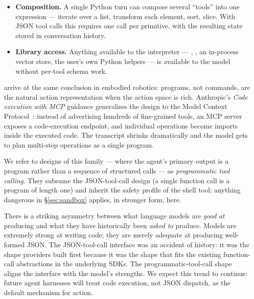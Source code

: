 \begin{itemize}[leftmargin=1.5em]
\item \textbf{Composition.} A single Python turn can compose several
  ``tools'' into one expression --- iterate over a list, transform
  each element, sort, slice. With JSON tool calls this requires one
  call per primitive, with the resulting state stored in conversation
  history.
\item \textbf{Library access.} Anything available to the
  interpreter --- , , an in-process
  vector store, the user's own Python helpers --- is available to
  the model without per-tool schema work.
\end{itemize}

\citet{liang2023codeaspolicies} arrive at the same conclusion in
embodied robotics: programs, not commands, are the natural action
representation when the action space is rich. Anthropic's
\emph{Code execution with MCP} guidance generalises the design to
the Model Context Protocol~\citep{mcp2024spec,anthropic2025mcpcode}:
instead of advertising hundreds of fine-grained tools, an MCP server
exposes a code-execution endpoint, and individual operations become
imports inside the executed code. The transcript shrinks
dramatically and the model gets to plan multi-step operations as a
single program.

We refer to designs of this family --- where the agent's primary
output is a program rather than a sequence of structured calls --- as
\emph{programmatic tool calling}. They subsume the JSON-tool-call
design (a single function call is a program of length one) and
inherit the safety profile of the shell tool: anything dangerous in
\S\ref{sec:sandbox} applies, in stronger form, here.

\begin{remarkbox}
\small
There is a striking asymmetry between what language models are
\emph{good at} producing and what they have historically been
\emph{asked to} produce. Models are extremely strong at writing
code; they are merely adequate at producing well-formed JSON. The
JSON-tool-call interface was an accident of history: it was the
shape providers built first because it was the shape that fits the
existing function-call abstractions in the underlying SDKs. The
programmatic-tool-call shape aligns the interface with the model's
strengths. We expect this trend to continue: future agent harnesses
will treat code execution, not JSON dispatch, as the default
mechanism for action.
\end{remarkbox}

